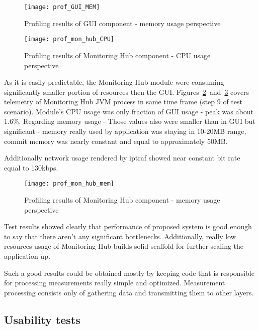 \begin{figure}[ht]
  \centering
  \texttt{[image: prof\_GUI\_MEM]}
  \caption{Profiling results of GUI component - memory usage perspective}
  \label{fig:prof_GUI_MEM}
\end{figure}




\begin{figure}[ht]
  \centering
  \texttt{[image: prof\_mon\_hub\_CPU]}
  \caption{Profiling results of Monitoring Hub component - CPU usage perspective}
  \label{fig:prof_mon_hub_CPU}
\end{figure}


As it is easily predictable, the Monitoring Hub module were consuming significantly smaller portion of resources then the GUI. Figures~\ref{fig:prof_mon_hub_CPU}~and~\ref{fig:prof_mon_hub_mem} covers telemetry of Monitoring Hub JVM process in same time frame (step 9 of test scenario). Module\rq{}s CPU usage was only fraction of GUI usage - peak was about 1.6\%. Regarding memory usage - Those values also were smaller than in GUI but significant - memory really used by application was staying in 10-20MB range, commit memory was nearly constant and equal to approximately 50MB.

Additionally network usage rendered by iptraf showed near constant bit rate equal to 130kbps.

\begin{figure}[ht]
  \centering
  \texttt{[image: prof\_mon\_hub\_mem]}
  \caption{Profiling results of Monitoring Hub component - memory usage perspective}
  \label{fig:prof_mon_hub_mem}
\end{figure}

Test results showed clearly that performance of proposed system is good enough to say that there aren\rq{}t any significant bottlenecks. Additionally, really low resources usage of Monitoring Hub builds solid scaffold for further scaling the application up.

Such a good results could be obtained mostly by keeping code that is responsible for processing measurements really simple and optimized. Measurement processing consists only of gathering data and transmitting them to other layers.


\subsection{Usability tests}

